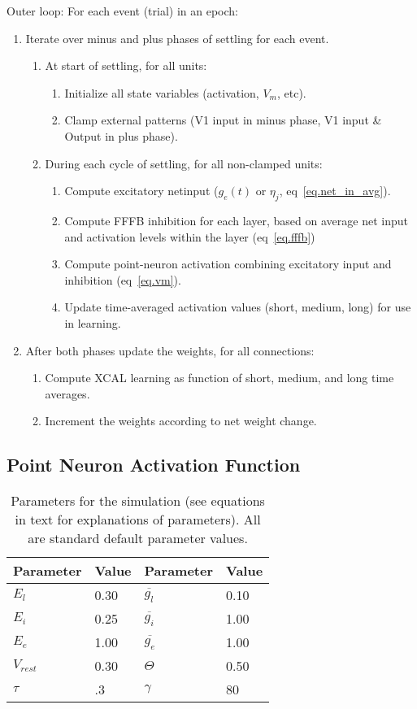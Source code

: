 \documentclass[11pt,twoside]{article}
\newif\myifpdf
\begin{document}
Outer loop: For each event (trial) in an epoch:
\begin{enumerate}
\item Iterate over minus and plus phases of settling for each event.
 \begin{enumerate}
 \item At start of settling, for all units:
  \begin{enumerate}
  \item Initialize all state variables (activation, $V_m$, etc).
  \item Clamp external patterns (V1 input in minus phase, V1 input \& Output in plus phase).
  \end{enumerate}
 \item During each cycle of settling, for all non-clamped units:
  \begin{enumerate}
  \item Compute excitatory netinput ($g_e(t)$ or $\eta_j$,
   eq~\ref{eq.net_in_avg}).
  \item Compute FFFB inhibition for each layer, based on average net input and activation levels within the layer (eq~\ref{eq.fffb})
  \item Compute point-neuron activation combining excitatory input and inhibition (eq~\ref{eq.vm}).
  \item Update time-averaged activation values (short, medium, long) for use in learning.
  \end{enumerate}
 \end{enumerate}
 \item After both phases update the weights, for all connections:
 \begin{enumerate}
 \item Compute XCAL learning as function of short, medium, and long time averages.
 \item Increment the weights according to net weight change.
 \end{enumerate}
\end{enumerate}

\subsection{Point Neuron Activation Function} 

\begin{table}
 \centering
 \begin{tabular}{ll|ll} \hline
Parameter & Value & Parameter & Value \\ \hline
$E_l$ & 0.30 & $\overline{g_l}$ & 0.10 \\
$E_i$ & 0.25 & $\overline{g_i}$ & 1.00 \\
$E_e$ & 1.00 & $\overline{g_e}$ & 1.00 \\
$V_{rest}$ & 0.30 & $\Theta$  & 0.50 \\
$\tau$ & .3 & $\gamma$ & 80 \\ \hline
 \end{tabular}
 \caption{\small Parameters for the simulation (see equations in text
  for explanations of parameters). All are standard default parameter values.}
 \label{tab.sim_params}
\end{table}
\end{document}

